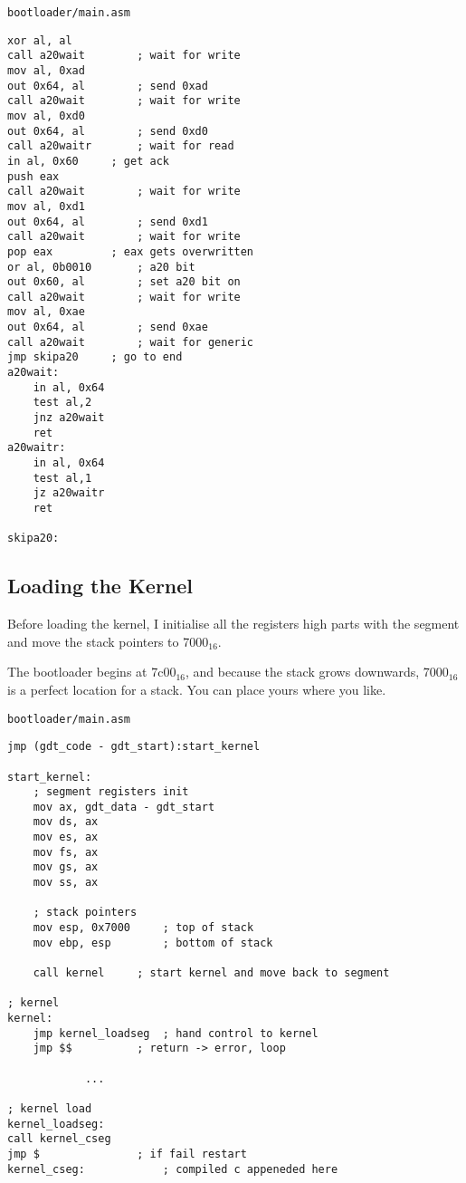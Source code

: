\documentclass{article}
\begin{document}
\begin{verbatim}
bootloader/main.asm
\end{verbatim}
\begin{verbatim}
xor al, al
call a20wait		; wait for write
mov al, 0xad
out 0x64, al		; send 0xad
call a20wait		; wait for write
mov al, 0xd0
out 0x64, al		; send 0xd0
call a20waitr		; wait for read
in al, 0x60		; get ack
push eax
call a20wait		; wait for write
mov al, 0xd1
out 0x64, al		; send 0xd1
call a20wait		; wait for write
pop eax			; eax gets overwritten
or al, 0b0010		; a20 bit
out 0x60, al		; set a20 bit on
call a20wait		; wait for write
mov al, 0xae
out 0x64, al		; send 0xae
call a20wait		; wait for generic
jmp skipa20		; go to end
a20wait:
	in al, 0x64
	test al,2
	jnz a20wait
	ret
a20waitr:
	in al, 0x64
	test al,1
	jz a20waitr
	ret

skipa20:
\end{verbatim}

\subsection{Loading the Kernel}

Before loading the kernel, I initialise all the registers high parts
with the segment and move the stack pointers to 7000$_{16}$.

The bootloader begins at 7c00$_{16}$\cite{7c00}, and because the
stack grows downwards, 7000$_{16}$ is a perfect location for a
stack. You can place yours where you like.

\begin{verbatim}
bootloader/main.asm
\end{verbatim}
\begin{verbatim}
jmp (gdt_code - gdt_start):start_kernel

start_kernel:
	; segment registers init
	mov ax, gdt_data - gdt_start
	mov ds, ax
	mov es, ax
	mov fs, ax
	mov gs, ax
	mov ss, ax

	; stack pointers
	mov esp, 0x7000		; top of stack
	mov ebp, esp		; bottom of stack

	call kernel		; start kernel and move back to segment

; kernel
kernel:
	jmp kernel_loadseg	; hand control to kernel
	jmp $$			; return -> error, loop

			...

; kernel load
kernel_loadseg:
call kernel_cseg
jmp $				; if fail restart
kernel_cseg:			; compiled c appeneded here
\end{verbatim}
\end{document}
